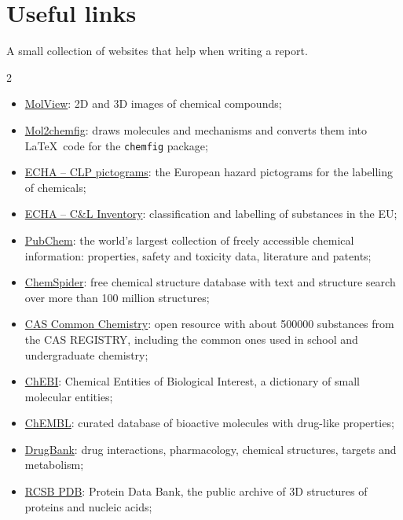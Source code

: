 \section*{Useful links}

A small collection of websites that help when writing a report.
\begin{footnotesize}
    \begin{multicols}{2}
        \begin{itemize}
            \item \href{https://molview.org/}{MolView}: 2D and 3D images of chemical compounds;
            \item \href{https://py-chemist.com/mol_2_chemfig/home}{Mol2chemfig}: draws molecules and mechanisms and converts them into \LaTeX\ code for the \texttt{chemfig} package;
            \item \href{https://echa.europa.eu/regulations/clp/clp-pictograms}{ECHA -- CLP pictograms}: the European hazard pictograms for the labelling of chemicals;
            \item \href{https://echa.europa.eu/information-on-chemicals/cl-inventory-database}{ECHA -- C\&L Inventory}: classification and labelling of substances in the EU;
            \item \href{https://pubchem.ncbi.nlm.nih.gov/}{PubChem}: the world's largest collection of freely accessible chemical information: properties, safety and toxicity data, literature and patents;
            \item \href{https://www.chemspider.com/}{ChemSpider}: free chemical structure database with text and structure search over more than 100 million structures;
            \item \href{https://commonchemistry.cas.org/}{CAS Common Chemistry}: open resource with about \num{500000} substances from the CAS REGISTRY, including the common ones used in school and undergraduate chemistry;
            \item \href{https://www.ebi.ac.uk/chebi/}{ChEBI}: Chemical Entities of Biological Interest, a dictionary of small molecular entities;
            \item \href{https://www.ebi.ac.uk/chembl/}{ChEMBL}: curated database of bioactive molecules with drug-like properties;
            \item \href{https://go.drugbank.com/}{DrugBank}: drug interactions, pharmacology, chemical structures, targets and metabolism;
            \item \href{https://www.rcsb.org/}{RCSB PDB}: Protein Data Bank, the public archive of 3D structures of proteins and nucleic acids;

\end{itemize}
\end{multicols}
\end{footnotesize}
